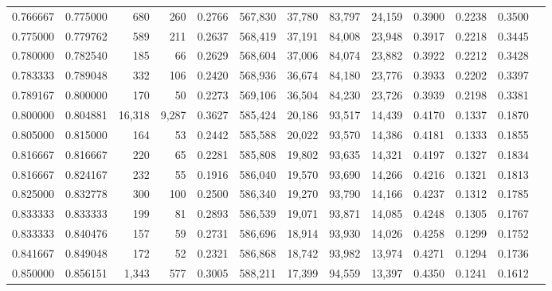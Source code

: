 \begin{tabular}{rrrrrrrrrrrrr}
0.766667 & 0.775000 &    680 &    260 &                                     0.2766 & 567,830 &  37,780 &  83,797 &  24,159 & 0.3900 & 0.2238 & 0.3500 \\
0.775000 & 0.779762 &    589 &    211 &                                     0.2637 & 568,419 &  37,191 &  84,008 &  23,948 & 0.3917 & 0.2218 & 0.3445 \\
0.780000 & 0.782540 &    185 &     66 &                                     0.2629 & 568,604 &  37,006 &  84,074 &  23,882 & 0.3922 & 0.2212 & 0.3428 \\
0.783333 & 0.789048 &    332 &    106 &                                     0.2420 & 568,936 &  36,674 &  84,180 &  23,776 & 0.3933 & 0.2202 & 0.3397 \\
0.789167 & 0.800000 &    170 &     50 &                                     0.2273 & 569,106 &  36,504 &  84,230 &  23,726 & 0.3939 & 0.2198 & 0.3381 \\
0.800000 & 0.804881 & 16,318 &  9,287 &                                     0.3627 & 585,424 &  20,186 &  93,517 &  14,439 & 0.4170 & 0.1337 & 0.1870 \\
0.805000 & 0.815000 &    164 &     53 &                                     0.2442 & 585,588 &  20,022 &  93,570 &  14,386 & 0.4181 & 0.1333 & 0.1855 \\
0.816667 & 0.816667 &    220 &     65 &                                     0.2281 & 585,808 &  19,802 &  93,635 &  14,321 & 0.4197 & 0.1327 & 0.1834 \\
0.816667 & 0.824167 &    232 &     55 &                                     0.1916 & 586,040 &  19,570 &  93,690 &  14,266 & 0.4216 & 0.1321 & 0.1813 \\
0.825000 & 0.832778 &    300 &    100 &                                     0.2500 & 586,340 &  19,270 &  93,790 &  14,166 & 0.4237 & 0.1312 & 0.1785 \\
0.833333 & 0.833333 &    199 &     81 &                                     0.2893 & 586,539 &  19,071 &  93,871 &  14,085 & 0.4248 & 0.1305 & 0.1767 \\
0.833333 & 0.840476 &    157 &     59 &                                     0.2731 & 586,696 &  18,914 &  93,930 &  14,026 & 0.4258 & 0.1299 & 0.1752 \\
0.841667 & 0.849048 &    172 &     52 &                                     0.2321 & 586,868 &  18,742 &  93,982 &  13,974 & 0.4271 & 0.1294 & 0.1736 \\
0.850000 & 0.856151 &  1,343 &    577 &                                     0.3005 & 588,211 &  17,399 &  94,559 &  13,397 & 0.4350 & 0.1241 & 0.1612 \\

\end{tabular}
